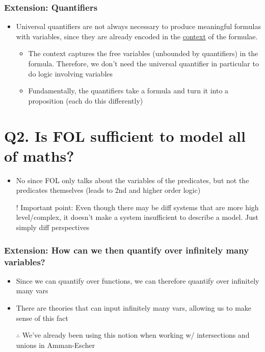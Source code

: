 \documentclass{article}
\begin{document}
\subsubsection*{Extension: Quantifiers}
\begin{itemize}
  \item Universal quantifiers are not always necessary to produce meaningful formulas with variables, since they are already encoded in the \underline{context} of the formulae.
  \begin{itemize}
    \item The context captures the free variables (unbounded by quantifiers) in the formula. Therefore, we don't need the universal quantifier in particular to do logic involving variables
    \item Fundamentally, the quantifiers take a formula and turn it into a proposition (each do this differently)
  \end{itemize}
\end{itemize}

\section*{Q2. Is FOL sufficient to model all of maths?}
\begin{itemize}
  \item No since FOL only talks about the variables of the predicates, but not the predicates themselves (leads to 2nd and higher order logic)
  \item[!]Important point: Even though there may be diff systems that are more high level/complex, it doesn't make a system insufficient to describe a model. Just simply diff perspectives
\end{itemize}

\subsubsection*{Extension: How can we then quantify over infinitely many variables?}
\begin{itemize}
  \item Since we can quantify over functions, we can therefore quantify over infinitely many vars
  \item There are theories that can input infinitely many vars, allowing us to make sense of this fact
  \item[$\therefore$] We’ve already been using this notion when working w/ intersections and unions in Amman-Escher
\end{itemize}
\end{document}
